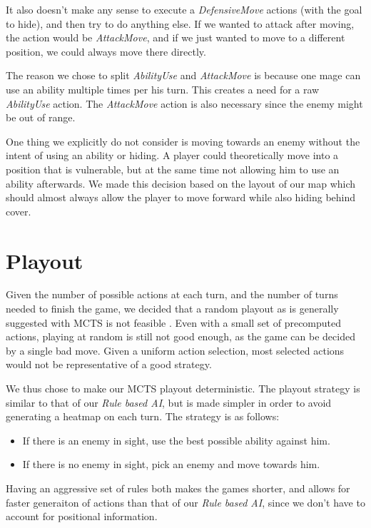 It also doesn't make any sense to execute a \emph{DefensiveMove} actions (with
the goal to hide), and then try to do anything else. If we wanted to attack
after moving, the action would be \emph{AttackMove}, and if we just wanted to
move to a different position, we could always move there directly.

The reason we chose to split \emph{AbilityUse} and \emph{AttackMove} is because one
mage can use an ability multiple times per his turn. This creates a need for a raw
\emph{AbilityUse} action. The \emph{AttackMove} action is also necessary since the enemy
might be out of range.

One thing we explicitly do not consider is moving towards an enemy without the intent
of using an ability or hiding. A player could theoretically move into a position
that is vulnerable, but at the same time not allowing him to use an ability afterwards.
We made this decision based on the layout of our map  which should
almost always allow the player to move forward while also hiding behind cover.

\section{Playout}

Given the number of possible actions at each turn, and the number of turns
needed to finish the game, we decided that a random playout as is generally
suggested with MCTS is not feasible .  Even
with a small set of precomputed actions, playing at random is still not good
enough, as the game can be decided by a single bad move. Given a uniform action
selection, most selected actions would not be representative of a good
strategy.

We thus chose to make our MCTS playout deterministic. The playout strategy
is similar to that of our \emph{Rule based AI}, but is made simpler in order
to avoid generating a heatmap on each turn. The strategy is as follows:

\begin{itemize}[align=right,labelwidth=3cm]
\item If there is an enemy in sight, use the best possible ability against him.
\item If there is no enemy in sight, pick an enemy and move towards him.
\end{itemize}

Having an aggressive set of rules both makes the games shorter, and allows for faster
generaiton of actions than that of our \emph{Rule based AI}, since we don't have to account
for positional information.

